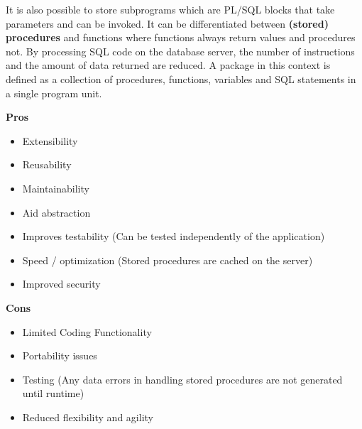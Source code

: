 It is also possible to store subprograms which are PL/SQL blocks that take parameters and can be invoked.
It can be differentiated between \textbf{(stored) procedures} and functions where functions always return values and procedures not.
By processing SQL code on the database server, the number of instructions and the amount of data returned are reduced.
A package in this context is defined as a collection of procedures, functions, variables and SQL statements in a single program unit.\\
\begin{minipage}[t]{0.49\textwidth}
    \textbf{Pros}
    \begin{itemize}[topsep=0pt,noitemsep]
      \item Extensibility
      \item Reusability
      \item Maintainability
      \item Aid abstraction
      \item Improves testability (Can be tested independently of the application)
      \item Speed / optimization (Stored procedures are cached on the server)
      \item Improved security
    \end{itemize}
\end{minipage}
\begin{minipage}[t]{0.49\textwidth}
    \textbf{Cons}
    \begin{itemize}[topsep=0pt, noitemsep]
      \item Limited Coding Functionality
      \item Portability issues
      \item Testing (Any data errors in handling stored procedures are not generated until runtime)
      \item Reduced flexibility and agility
    \end{itemize}
\end{minipage}
\vspace{20pt}

